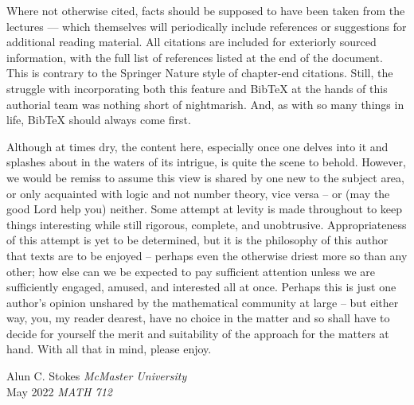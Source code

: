 Where not otherwise cited, facts should be supposed to have been taken from the lectures — which themselves will periodically include references or suggestions for additional reading material. All citations are included for exteriorly sourced information, with the full list of references listed at the end of the document. This is contrary to the Springer Nature style of chapter-end citations. Still, the struggle with incorporating both this feature and BibTeX at the hands of this authorial team was nothing short of nightmarish. And, as with so many things in life, BibTeX should always come first.

Although at times dry, the content here, especially once one delves into it and splashes about in the waters of its intrigue, is quite the scene to behold. However, we would be remiss to assume this view is shared by one new to the subject area, or only acquainted with logic and not number theory, vice versa -- or (may the good Lord help you) neither. Some attempt at levity is made throughout to keep things interesting while still rigorous, complete, and unobtrusive. Appropriateness of this attempt is yet to be determined, but it is the philosophy of this author that texts are to be enjoyed -- perhaps even the otherwise driest more so than any other; how else can we be expected to pay sufficient attention unless we are sufficiently engaged, amused, and interested all at once. Perhaps this is just one author's opinion unshared by the mathematical community at large -- but either way, you, my reader dearest, have no choice in the matter and so shall have to decide for yourself the merit and suitability of the approach for the matters at hand. With all that in mind, please enjoy.


\vspace{\baselineskip}
\begin{flushright}\noindent
Alun C. Stokes \hfill {\it McMaster University}\\
May 2022 \hfill {\it MATH 712}\\
\end{flushright}


